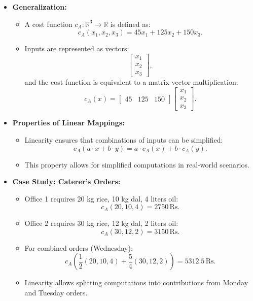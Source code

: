 \documentclass{article}
\begin{document}
\begin{itemize}
  \item \textbf{Generalization:}
    \begin{itemize}
      \item A cost function $c_A: \mathbb{R}^3 \to \mathbb{R}$ is defined as:
        \[
          c_A(x_1, x_2, x_3) = 45x_1 + 125x_2 + 150x_3.
        \]
      \item Inputs are represented as vectors:
        \[
          \begin{bmatrix}
            x_1 \\
            x_2 \\
            x_3
          \end{bmatrix},
        \]
        and the cost function is equivalent to a matrix-vector multiplication:
        \[
          c_A(x) =
          \begin{bmatrix}
            45 & 125 & 150
          \end{bmatrix}
          \begin{bmatrix}
            x_1 \\
            x_2 \\
            x_3
          \end{bmatrix}.
        \]
    \end{itemize}

  \item \textbf{Properties of Linear Mappings:}
    \begin{itemize}
      \item Linearity ensures that combinations of inputs can be simplified:
        \[
          c_A(a \cdot x + b \cdot y) = a \cdot c_A(x) + b \cdot c_A(y).
        \]
      \item This property allows for simplified computations in real-world scenarios.
    \end{itemize}

  \item \textbf{Case Study: Caterer’s Orders:}
    \begin{itemize}
      \item Office 1 requires 20 kg rice, 10 kg dal, 4 liters oil:
        \[
          c_A(20, 10, 4) = 2750 \, \text{Rs}.
        \]
      \item Office 2 requires 30 kg rice, 12 kg dal, 2 liters oil:
        \[
          c_A(30, 12, 2) = 3150 \, \text{Rs}.
        \]
      \item For combined orders (Wednesday):
        \[
          c_A\left(\frac{1}{2}(20, 10, 4) + \frac{5}{4}(30, 12, 2)\right) = 5312.5 \, \text{Rs}.
        \]
      \item Linearity allows splitting computations into contributions from Monday and Tuesday orders.
    \end{itemize}


\end{itemize}
\end{document}
